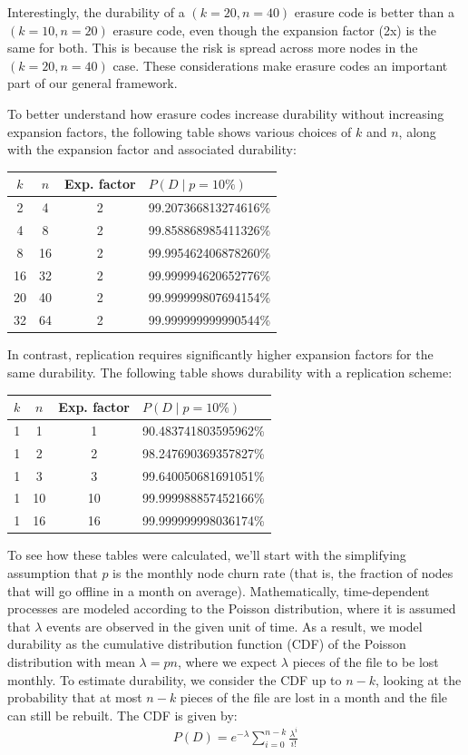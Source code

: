 \documentclass[8pt,fleqn,openany]{book}
\begin{document}
Interestingly, the durability of a $(k=20,n=40)$ erasure code
is better than a $(k=10,n=20)$ erasure code, even though the expansion factor
(2x) is the same for both. This is because the risk is spread
across more nodes in the $(k=20,n=40)$ case. These considerations make erasure
codes an important part of our general framework.

To better understand how erasure codes increase durability without
increasing expansion factors, the following table shows various choices of
$k$ and $n$, along with the expansion factor and associated durability:

\begin{center}
\begin{tabular}{c c c l}
$k$ & $n$ & Exp. factor & $P(D \mid p = 10\%)$ \\ \hline
2 & 4 & 2 & 99.207366813274616\%\\
4 & 8 & 2 & 99.858868985411326\%\\
8 & 16 & 2 & 99.995462406878260\%\\
16 & 32 & 2 & 99.999994620652776\%\\
20 & 40 & 2 & 99.999999807694154\%\\
32 & 64 & 2 & 99.999999999990544\%\\
\end{tabular}
\end{center}

In contrast, replication requires significantly higher expansion factors for
the same durability. The following table shows durability with a replication
scheme:

\begin{center}
\begin{tabular}{c c c l}
$k$ & $n$ & Exp. factor & $P(D \mid p = 10\%)$ \\ \hline
1 & 1 & 1 & 90.483741803595962\%\\
1 & 2 & 2 & 98.247690369357827\%\\
1 & 3 & 3 & 99.640050681691051\%\\
1 & 10 & 10 & 99.999988857452166\%\\
1 & 16 & 16 & 99.999999998036174\%\\
\end{tabular}
\end{center}

To see how these tables were calculated, we'll start
with the simplifying assumption that $p$ is the monthly node
churn rate (that is, the fraction of nodes that will go offline in a month on
average).
Mathematically, time-dependent processes are modeled according to
the Poisson distribution, where it is assumed that $\lambda$ events are
observed in the given unit of time.
As a result, we model durability
as the cumulative distribution function (CDF) of the Poisson distribution with mean $\lambda=pn$,
where we expect $\lambda$ pieces of the file to be lost monthly.
To estimate
durability, we consider the CDF up to $n-k$,
looking at the probability that at most $n-k$ pieces
of the file are lost in a month and the file can still be rebuilt.
The CDF is given by:
\begin{align*}
 && P(D) = e^{-\lambda} \sum_{i=0}^{n-k} \frac{\lambda^i}{i!} &&
\end{align*}
\end{document}
